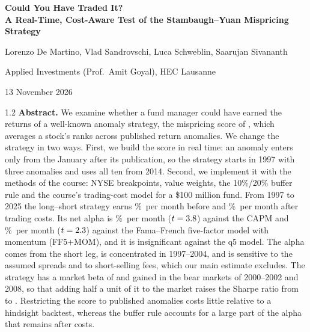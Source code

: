 \documentclass[12pt,a4paper]{article}
\newcommand{\pmo}{\%~per month}
\begin{document}
\begin{titlepage}
\centering
{\Large\bfseries Could You Have Traded It?\\[4pt] A Real-Time, Cost-Aware Test of the Stambaugh--Yuan Mispricing Strategy\par}
\vspace{1.2cm}
{\large Lorenzo De Martino, Vlad Sandrovschi, Luca Schweblin, Saarujan Sivananth\par}
\vspace{0.4cm}
{Applied Investments (Prof.\ Amit Goyal), HEC Lausanne\par}
\vspace{0.2cm}
{13 November 2026\par}
\vspace{1.2cm}
\begin{minipage}{0.88\textwidth}
\begin{spacing}{1.2}
\noindent\textbf{Abstract.} We examine whether a fund manager could have earned the returns of a well-known anomaly strategy, the mispricing score of \citet{stambaugh2017}, which averages a stock's ranks across published return anomalies. We change the strategy in two ways. First, we build the score in real time: an anomaly enters only from the January after its publication, so the strategy starts in 1997 with three anomalies and uses all ten from 2014. Second, we implement it with the methods of the course: NYSE breakpoints, value weights, the 10\%/20\% buffer rule and the course's trading-cost model for a \$100 million fund. From 1997 to 2025 the long--short strategy earns \grossfullmean\pmo{} before and \netfullmean\pmo{} after trading costs. Its net alpha is \netfullcapm\pmo{} ($t=3.8$) against the CAPM and \netfulla\pmo{} ($t=2.3$) against the Fama--French five-factor model with momentum (FF5+MOM), and it is insignificant against the q5 model. The alpha comes from the short leg, is concentrated in 1997--2004, and is sensitive to the assumed spreads and to short-selling fees, which our main estimate excludes. The strategy has a market beta of \capmbeta{} and gained in the bear markets of 2000--2002 and 2008, so that adding half a unit of it to the market raises the Sharpe ratio from \ovsrzero{} to \ovsrhalf. Restricting the score to published anomalies costs little relative to a hindsight backtest, whereas the buffer rule accounts for a large part of the alpha that remains after costs.
\end{spacing}
\end{minipage}
\vfill
\end{titlepage}
\end{document}
